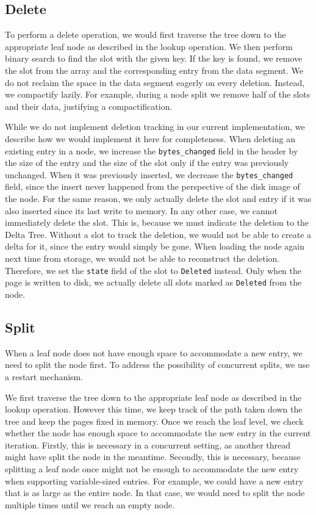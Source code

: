\subsection*{Delete}
\label{subsec:delete}
To perform a delete operation, we would first traverse the tree down to the appropriate leaf node as described in the lookup operation.
We then perform binary search to find the slot with the given key.
If the key is found, we remove the slot from the array and the corresponding entry from the data segment.
We do not reclaim the space in the data segment eagerly on every deletion.
Instead, we compactify lazily. 
For example, during a node split we remove half of the slots and their data, justifying a compactification.

While we do not implement deletion tracking in our current implementation, we describe how we would implement it here for completeness.
When deleting an existing entry in a node, we increase the \texttt{bytes\_changed} field in the header by the size of the entry and the size of the slot only if the entry was previously unchanged.
When it was previously inserted, we decrease the \texttt{bytes\_changed} field, since the insert never happened from the perspective of the disk image of the node.
For the same reason, we only actually delete the slot and entry if it was also inserted since its last write to memory.
In any other case, we cannot immediately delete the slot.
This is, because we must indicate the deletion to the Delta Tree.
Without a slot to track the deletion, we would not be able to create a delta for it, since the entry would simply be gone.
When loading the node again next time from storage, we would not be able to reconstruct the deletion.
Therefore, we set the \texttt{state} field of the slot to \texttt{Deleted} instead.
Only when the page is written to disk, we actually delete all slots marked as \texttt{Deleted} from the node.

\subsection*{Split}
\label{subsec:split}
When a leaf node does not have enough space to accommodate a new entry, we need to split the node first.
To address the possibility of concurrent splits, we use a restart mechanism.

We first traverse the tree down to the appropriate leaf node as described in the lookup operation.
However this time, we keep track of the path taken down the tree and keep the pages fixed in memory.
Once we reach the leaf level, we check whether the node has enough space to accommodate the new entry in the current iteration.
Firstly, this is necessary in a concurrent setting, as another thread might have split the node in the meantime.
Secondly, this is necessary, because splitting a leaf node once might not be enough to accommodate the new entry when supporting variable-sized entries.
For example, we could have a new entry that is as large as the entire node.
In that case, we would need to split the node multiple times until we reach an empty node.

